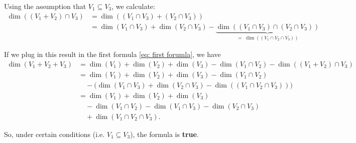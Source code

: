 \begin{xrcs}
  Using the assumption that $V_1 \subseteq V_3$, we calculate:
  \begin{equation}
    \begin{aligned}
      \dim ((V_1 + V_2) \cap V_3)
      &= \dim ((V_1 \cap V_3) + (V_2 \cap V_3)) \\
      &= \dim (V_1 \cap V_3) + \dim (V_2 \cap V_3) - \underbrace{\dim ((V_1 \cap V_3) \cap (V_2\cap V_3))}_{= \; \dim ((V_1 \cap V_2 \cap V_3))}
    \end{aligned}
  \end{equation}

  If we plug in this result in the first formula \eqref{eq: first forumla}, we have
  \begin{equation}
    \begin{aligned}
      \dim (V_1 + V_2 + V_3)
      &= \dim (V_1) + \dim (V_2) + \dim (V_3) - \dim (V_1 \cap V_2) - \dim ((V_1 + V_2) \cap V_3) \\
      &= \dim (V_1) + \dim (V_2) + \dim (V_3) - \dim (V_1 \cap V_2) \\
      &\quad - \big(\dim (V_1 \cap V_3) + \dim (V_2 \cap V_3) - \dim ((V_1 \cap V_2 \cap V_3)) \big) \\
      &= \dim (V_1) + \dim (V_2) + \dim (V_3) \\
      & \quad - \dim(V_1 \cap V_2) - \dim (V_1 \cap V_3) - \dim (V_2 \cap V_3) \\
      & \quad + \dim (V_1 \cap V_2 \cap V_3).
    \end{aligned}
  \end{equation}

  So, under certain conditions (i.e. $V_1 \subseteq V_3$), the formula is \textbf{true}.
\end{xrcs}

